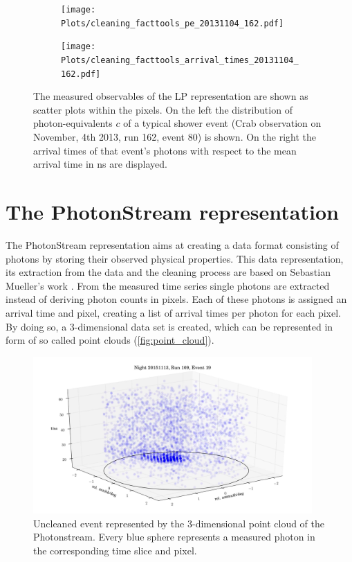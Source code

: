 \begin{figure}
  \begin{subfigure}{0.475\textwidth}
    \texttt{[image: Plots/cleaning\_facttools\_pe\_20131104\_162.pdf]}
  \end{subfigure}
  \begin{subfigure}{0.475\textwidth}
    \texttt{[image: Plots/cleaning\_facttools\_arrival\_times\_20131104\_162.pdf]}
  \end{subfigure}
  \caption{The measured observables of the LP representation are shown as scatter plots within the pixels. On the left the distribution of photon-equivalents $c$ of a typical shower event (Crab observation on November, 4th 2013, run 162, event 80) is shown. On the right the arrival times of that event's photons with respect to the mean arrival time in ns are displayed.}
  \label{fig:mainpulse}
\end{figure}

\section{The PhotonStream representation}
\label{sec:phs}
%
The PhotonStream representation aims at creating a data format consisting of photons by storing their observed physical properties. This data representation, its extraction from the data and the cleaning process are based on Sebastian Mueller's work \cite{sebastian, photonstream, phs}. From the measured time series single photons are extracted instead of deriving photon counts in pixels. Each of these photons is assigned an arrival time and pixel, creating a list of arrival times per photon for each pixel. By doing so, a 3-dimensional data set is created, which can be represented in form of so called point clouds (\autoref{fig:point_cloud}).
%
\begin{figure}
  \centering
  \includegraphics[width=0.95\textwidth]{Plots/event2.png}
  \caption{Uncleaned event represented by the 3-dimensional point cloud of the Photonstream. Every blue sphere represents a measured photon in the corresponding time slice and pixel.}
  \label{fig:point_cloud}
\end{figure}
%
